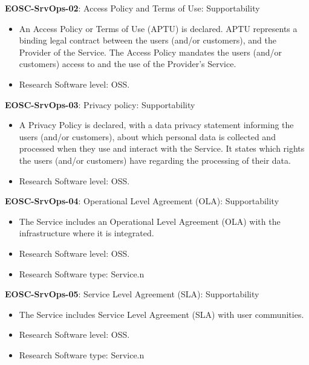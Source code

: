 \textbf{EOSC-SrvOps-02}: Access Policy and Terms of Use: Supportability

\begin{itemize}
    \item An Access Policy or Terms of Use (APTU) is declared. APTU represents a binding legal contract between the users (and/or customers), and the Provider of the Service. The Access Policy mandates the users (and/or customers) access to and the use of the Provider's Service. \cite{orviz_fernandez_eosc-synergy_2020}
    \item Research Software level: OSS.
\end{itemize}

\textbf{EOSC-SrvOps-03}: Privacy policy: Supportability

\begin{itemize}
    \item A Privacy Policy is declared, with a data privacy statement informing the users (and/or customers), about which personal data is collected and processed when they use and interact with the Service. It states which rights the users (and/or customers) have regarding the processing of their data. \cite{orviz_fernandez_eosc-synergy_2020}
    \item Research Software level: OSS.
\end{itemize}

\textbf{EOSC-SrvOps-04}: Operational Level Agreement (OLA): Supportability

\begin{itemize}
    \item The Service includes an Operational Level Agreement (OLA) with the infrastructure where it is integrated. \cite{orviz_fernandez_eosc-synergy_2020}
    \item Research Software level: OSS.
    \item Research Software type: Service.n\end{itemize}

\textbf{EOSC-SrvOps-05}: Service Level Agreement (SLA): Supportability

\begin{itemize}
    \item The Service includes Service Level Agreement (SLA) with user communities. \cite{orviz_fernandez_eosc-synergy_2020}
    \item Research Software level: OSS.
    \item Research Software type: Service.n\end{itemize}

